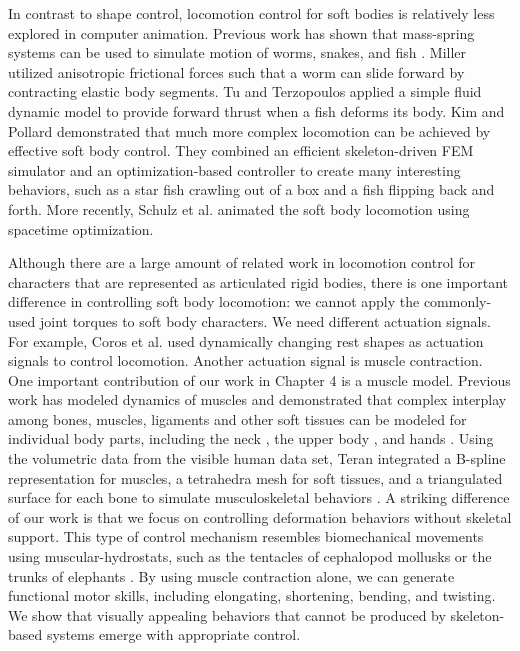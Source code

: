 In contrast to shape control, locomotion control for soft bodies is
relatively less explored in computer animation. Previous work has shown that mass-spring systems can be used to simulate motion of worms, snakes, and fish
\cite{Miller:1988,Tu:1994,Grzeszczuk:1995}. Miller
\cite{Miller:1988} utilized anisotropic frictional forces such
that a worm can slide forward by contracting elastic body segments. Tu
and Terzopoulos \cite{Tu:1994} applied a simple fluid dynamic
model to provide forward thrust when a fish deforms its body. Kim and Pollard \cite{Kim:2011:DCO,Kim:2011} demonstrated
that much more complex locomotion can be achieved by effective soft
body control. They combined an efficient skeleton-driven FEM simulator
and an optimization-based controller to create many interesting
behaviors, such as a star fish crawling out of a box and a fish
flipping back and forth. More recently, Schulz et al. \cite{Schulz:2014} animated the soft body locomotion using spacetime optimization.

Although there are a large amount of related work in locomotion control for characters that are represented as articulated rigid bodies, there is one important difference in controlling soft body locomotion: we cannot apply the commonly-used joint torques to soft body characters. We need different actuation signals. For example, Coros et al. \cite{Coros:2012} used dynamically changing rest shapes as actuation signals to control locomotion. Another actuation signal is muscle contraction. One important contribution of our work in Chapter 4 is a muscle model. Previous work has modeled dynamics of muscles and
demonstrated that complex interplay among bones, muscles, ligaments and
other soft tissues can be modeled for individual body parts, including
the neck \cite{Lee:2006}, the upper body
\cite{Zordan:2006,Dilorenzo:2008,Lee:2009:CBM}, and hands
\cite{Tsang:2005,Sueda:2008}. Using the volumetric data from the
visible human data set, Teran \etal integrated a B-spline
representation for muscles, a tetrahedra mesh for soft tissues, and a
triangulated surface for each bone to simulate musculoskeletal
behaviors \cite{Teran:2003,Teran:2005}. A striking difference of our
work is that we focus on controlling deformation behaviors without
skeletal support. This type of control mechanism resembles
biomechanical movements using muscular-hydrostats, such as the
tentacles of cephalopod mollusks or the trunks of elephants
\cite{Kier:1985}. By using muscle contraction alone, we can generate
functional motor skills, including elongating, shortening,
bending, and twisting. We show that visually appealing behaviors that
cannot be produced by skeleton-based systems emerge with
appropriate control.

